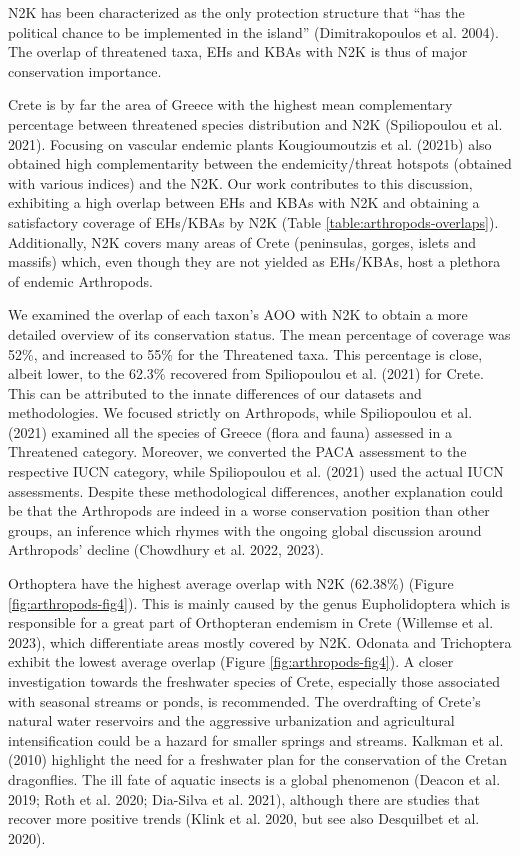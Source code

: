 N2K has been characterized as the only protection structure that “has the
political chance to be implemented in the island” (Dimitrakopoulos et al. 2004).
The overlap of threatened taxa, EHs and KBAs with N2K is thus of major
conservation importance. 

Crete is by far the area of Greece with the highest mean complementary
percentage between threatened species distribution and N2K (Spiliopoulou et al. 2021).
Focusing on vascular endemic plants Kougioumoutzis et al. (2021b) also obtained
high complementarity between the endemicity/threat hotspots
(obtained with various indices) and the N2K. Our work contributes to this
discussion, exhibiting a high overlap between EHs and KBAs with N2K and
obtaining a satisfactory coverage of  EHs/KBAs by N2K (Table \ref{table:arthropods-overlaps}).
Additionally, N2K covers many areas of Crete (peninsulas, gorges, islets and
massifs) which, even though they are not yielded as EHs/KBAs, host a plethora
of endemic Arthropods.

We examined the overlap of each taxon’s AOO with N2K to obtain a more detailed
overview of its conservation status. The mean percentage of coverage was 52\%,
and increased to 55\% for the Threatened taxa. This percentage is close, albeit
lower, to the 62.3\% recovered from Spiliopoulou et al. (2021) for Crete. This
can be attributed to the innate differences of our datasets and methodologies.
We focused strictly on Arthropods, while Spiliopoulou et al. (2021) examined
all the species of Greece (flora and fauna) assessed in a Threatened category.
Moreover, we converted the PACA assessment to the respective IUCN category,
while Spiliopoulou et al. (2021) used the actual IUCN assessments. Despite
these methodological differences, another explanation could be that the
Arthropods are indeed in a worse conservation position than other groups, an
inference which rhymes with the ongoing global discussion around Arthropods’
decline (Chowdhury et al. 2022, 2023).

Orthoptera have the highest average overlap with N2K (62.38\%) (Figure \ref{fig:arthropods-fig4}).
This is mainly caused by the genus Eupholidoptera which is responsible for a
great part of Orthopteran endemism in Crete (Willemse et al. 2023), which
differentiate areas mostly covered by N2K. Odonata and Trichoptera exhibit the
lowest average overlap (Figure \ref{fig:arthropods-fig4}). A closer investigation towards the
freshwater species of Crete, especially those associated with seasonal streams
or ponds, is recommended. The overdrafting of Crete’s natural water reservoirs
and the aggressive urbanization and agricultural intensification could be a
hazard for smaller springs and streams. Kalkman et al. (2010) highlight the
need for a freshwater plan for the conservation of the Cretan dragonflies.
The ill fate of aquatic insects is a global phenomenon (Deacon et al. 2019; Roth et al. 2020; Dia-Silva et al. 2021),
although there are studies that recover more positive trends (Klink et al. 2020, but see also Desquilbet et al. 2020).

